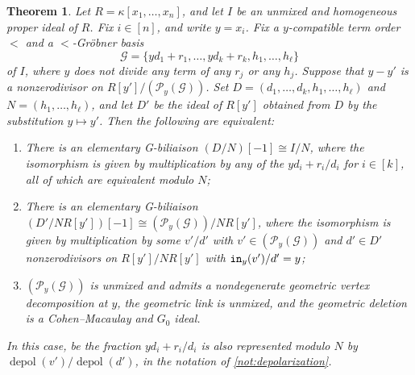 \documentclass[12pt, reqno]{amsart}
\numberwithin{equation}{section}
\newtheorem{theorem}{Theorem}[section]
\newtheorem{Main Conjecture}[theorem]{Main Conjecture}
\theoremstyle{definition}
\theoremstyle{plain}
\newcommand{\init}{{\tt in}}
\newcommand{\G}{\mathcal{G}}
\renewcommand{\P}{\mathcal{P}}
\DeclareMathOperator{\depol}{depol}
\begin{document}
\begin{theorem}\label{thm:polarLink}
    Let $R = \kappa[x_1, \ldots, x_n]$, and let $I$ be an unmixed and homogeneous proper ideal of $R$.  Fix $i \in [n]$, and write $y=x_i$.  Fix a $y$-compatible term order $<$ and a $<$-Gr\"obner basis \[
\G = \{yd_1+r_1, \ldots, yd_k+r_k, h_1, \ldots, h_\ell\}
    \] of $I$, where $y$ does not divide any term of any $r_j$ or any $h_j$.  Suppose that $y-y'$ is a nonzerodivisor on $R[y']/(\P_y(\G))$.  Set $D = (d_1, \ldots, d_k, h_1, \ldots, h_\ell)$ and $N = (h_1, \ldots, h_\ell)$, and let $D'$ be the ideal of $R[y']$ obtained from $D$ by the substitution $y \mapsto y'$.  Then the following are equivalent:
    \begin{enumerate}
        \item There is an elementary G-biliaison $(D/N)[-1] \cong I/N$, where the isomorphism is given by multiplication by any of the $yd_i+r_i/d_i$ for $i\in [k]$, all of which are equivalent modulo $N$;
        \item There is an elementary G-biliaison $(D'/NR[y'])[-1] \cong (\P_y(\G))/NR[y']$, where the isomorphism is given by multiplication by some $v'/d'$ with $v' \in (\P_y(\G))$ and $d' \in D'$ nonzerodivisors on $R[y']/NR[y']$ with $\init_y(v')/d' = y$;
        \item $(\P_y(\G))$ is unmixed and admits a nondegenerate geometric vertex decomposition at $y$, the geometric link is unmixed, and the geometric deletion is a Cohen--Macaulay and $G_0$ ideal.
    \end{enumerate}

    In this case,  be the fraction $yd_i+r_i/d_i$ is also represented modulo $N$ by $\depol(v')/\depol(d')$, in the notation of \cref{not:depolarization}.
    
\end{theorem}
\end{document}
